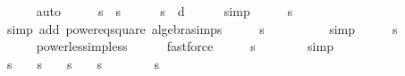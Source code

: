 \begin{isabellebody}
\ \ \ \ \isamarkupfalse%
\ auto\isanewline
\ \ \isamarkupfalse%
\ \isamarkupfalse%
\ {\isachardoublequoteopen}{}{\isacharasterisk}s{\isacharcircum}{}\ {\isacharless}\ {\isacharparenleft}s{\isacharplus}{}{\isacharparenright}{\isacharcircum}{}{\isachardoublequoteclose}\isanewline
\ \ \ \ \isamarkupfalse%
\ {\isacharbackquoteopen}{}{\isacharasterisk}s{\isacharcircum}{}\ {\isacharless}\ {}{\isacharasterisk}d{\isacharcircum}{}{\isacharbackquoteclose}\isanewline
\ \ \ \ \isamarkupfalse%
\ simp\isanewline
\ \ \isamarkupfalse%
\ \isamarkupfalse%
\ {\isachardoublequoteopen}{\isacharparenleft}s\ {\isacharminus}\ {}{\isacharparenright}{\isacharcircum}{}\ {\isacharless}\ {}{\isachardoublequoteclose}\isanewline
\ \ \ \ \isamarkupfalse%
\ {\isacharparenleft}simp\ add{\isacharcolon}\ power{}{\isacharunderscore}eq{\isacharunderscore}square\ algebra{\isacharunderscore}simps{\isacharparenright}\isanewline
\ \ \isamarkupfalse%
\ \isamarkupfalse%
\ {\isachardoublequoteopen}{\isacharparenleft}s\ {\isacharminus}\ {}{\isacharparenright}{\isacharcircum}{}\ {\isacharless}\ {}{\isacharcircum}{}{\isachardoublequoteclose}\isanewline
\ \ \ \ \isamarkupfalse%
\ simp\isanewline
\ \ \isamarkupfalse%
\ \isamarkupfalse%
\ {\isachardoublequoteopen}s\ {\isacharminus}\ {}\ {\isacharless}\ {}{\isachardoublequoteclose}\isanewline
\ \ \ \ \isamarkupfalse%
\ power{}{\isacharunderscore}less{\isacharunderscore}imp{\isacharunderscore}less\isanewline
\ \ \ \ \isamarkupfalse%
\ fastforce\isanewline
\ \ \isamarkupfalse%
\ \isamarkupfalse%
\ {\isachardoublequoteopen}s\ {\isasymle}\ {}{\isachardoublequoteclose}\isanewline
\ \ \ \ \isamarkupfalse%
\ simp\isanewline
\ \ \isamarkupfalse%
\ \isamarkupfalse%
\ {\isachardoublequoteopen}s\ {\isacharequal}\ {}\ {\isasymor}\ s\ {\isacharequal}\ {}\ {\isasymor}\ s\ {\isacharequal}\ {}\ {\isasymor}\ s\ {\isacharequal}\ {}{\isachardoublequoteclose}\isanewline
\ \ \ \ \isamarkupfalse%
\ {\isacharbackquoteopen}s\ {\isachargreater}\ {}{\isacharbackquoteclose}\isanewline

\end{isabellebody}
